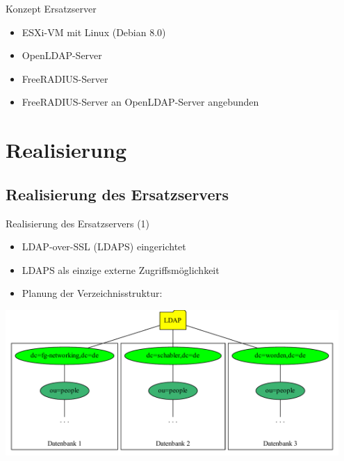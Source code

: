\documentclass[presentation,svgnames,12pt]{beamer}
\begin{document}
\begin{frame}{Konzept Ersatzserver}
\begin{itemize}
	\item ESXi-VM mit Linux (Debian 8.0)
	\item OpenLDAP-Server%
	\item FreeRADIUS-Server%
	\item FreeRADIUS-Server an OpenLDAP-Server angebunden%
\end{itemize}
\end{frame}


\section{Realisierung}
\subsection{Realisierung des Ersatzservers}
\begin{frame}{Realisierung des Ersatzservers (1)}
\begin{itemize}
	\item LDAP-over-SSL (LDAPS) eingerichtet %
	\item LDAPS als einzige externe Zugriffsmöglichkeit
	\item Planung der Verzeichnisstruktur: %
\end{itemize}
\vspace{2pt}
\centering
\includegraphics[width=0.95\textwidth]{Bilder/LDAP-fgn-planned.pdf}
\end{frame}
\end{document}
